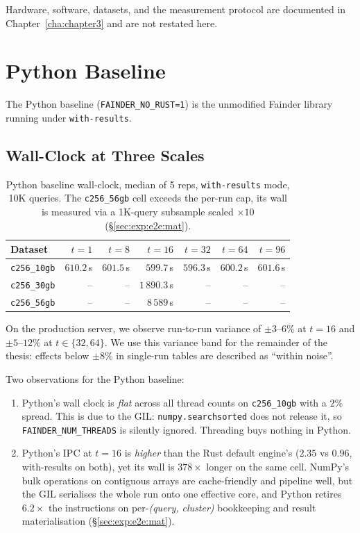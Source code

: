 Hardware, software, datasets, and the measurement protocol are documented in Chapter~\ref{cha:chapter3} and are not restated here.

\section{Python Baseline\label{sec:exp:python}}

The Python baseline (\texttt{FAINDER\_NO\_RUST=1}) is the unmodified Fainder library running under \texttt{with-results}.

\subsection{Wall-Clock at Three Scales\label{sec:exp:python:wall}}

\begin{table}[H]
  \centering
  \caption[Python baseline wall-clock.]{Python baseline wall-clock, median of 5 reps, \texttt{with-results} mode, 10K queries. The \texttt{c256\_56gb} cell exceeds the per-run cap, its wall is measured via a 1K-query subsample scaled $\times 10$ (§\ref{sec:exp:e2e:mat}).}
  \label{tab:python_wall}
  \begin{tabular}{lrrrrrr}
    \toprule
    Dataset & $t{=}1$ & $t{=}8$ & $t{=}16$ & $t{=}32$ & $t{=}64$ & $t{=}96$ \\
    \midrule
    \texttt{c256\_10gb} & $610.2$\,s & $601.5$\,s & $599.7$\,s & $596.3$\,s & $600.2$\,s & $601.6$\,s \\
    \texttt{c256\_30gb} & -- & -- & $1\,890.3$\,s & -- & -- & -- \\
    \texttt{c256\_56gb} & -- & -- & $8\,589$\,s & -- & -- & -- \\
    \bottomrule
  \end{tabular}
\end{table}

On the production server, we observe run-to-run variance of $\pm 3$--$6\%$ at $t=16$ and $\pm 5$--$12\%$ at $t \in \{32, 64\}$. We use this variance band for the remainder of the thesis: effects below $\pm 8\%$ in single-run tables are described as ``within noise''.

Two observations for the Python baseline:

\begin{enumerate}
  \item Python's wall clock is \emph{flat} across all thread counts on \texttt{c256\_10gb} with a $2\%$ spread. This is due to the GIL: \texttt{numpy.searchsorted} does not release it, so \texttt{FAINDER\_NUM\_THREADS} is silently ignored. Threading buys nothing in Python.
  \item Python's IPC at $t{=}16$ is \emph{higher} than the Rust default engine's ($2.35$ vs $0.96$, with-results on both), yet its wall is $378\times$ longer on the same cell. NumPy's bulk operations on contiguous arrays are cache-friendly and pipeline well, but the GIL serialises the whole run onto one effective core, and Python retires $6.2\times$ the instructions on per-\emph{(query, cluster)} bookkeeping and result materialisation (§\ref{sec:exp:e2e:mat}).
\end{enumerate}


